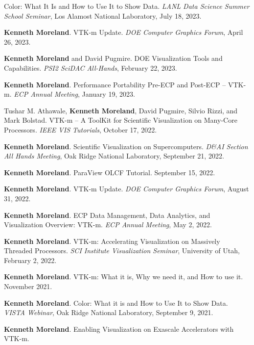\begin{enumerate}[label={[\arabic*]}, left=0pt]
  Color: What It Is and How to Use It to Show Data.
  \emph{LANL Data Science Summer School Seminar}, Los Alamost National Laboratory, July 18, 2023.
\item  %
  \textbf{Kenneth Moreland}.
  VTK-m Update.
  \emph{DOE Computer Graphics Forum}, April 26, 2023.
\item  %
  \textbf{Kenneth Moreland} and David Pugmire.
  DOE Visualization Tools and Capabilities.
  \emph{PSI2 SciDAC All-Hands}, February 22, 2023.
\item  %
  \textbf{Kenneth Moreland}.
  Performance Portability Pre-ECP and Post-ECP -- VTK-m.
  \emph{ECP Annual Meeting}, January 19, 2023.
\item  %
  Tushar M. Athawale, \textbf{Kenneth Moreland}, David Pugmire, Silvio Rizzi, and Mark Bolstad.
  VTK-m -- A ToolKit for Scientific Visualization on Many-Core Processors.
  \emph{IEEE VIS Tutorials}, October 17, 2022.
\item  %
  \textbf{Kenneth Moreland}.
  Scientific Visualization on Supercomputers.
  \emph{D\&AI Section All Hands Meeting}, Oak Ridge National Laboratory, September 21, 2022.
\item  %
  \textbf{Kenneth Moreland}.
  ParaView OLCF Tutorial.
September 15, 2022.
\item  %
  \textbf{Kenneth Moreland}.
  VTK-m Update.
  \emph{DOE Computer Graphics Forum}, August 31, 2022.
\item  %
  \textbf{Kenneth Moreland}.
  ECP Data Management, Data Analytics, and Visualization Overview: VTK-m.
  \emph{ECP Annual Meeting}, May 2, 2022.
\item  %
  \textbf{Kenneth Moreland}.
  VTK-m: Accelerating Visualization on Massively Threaded Processors.
  \emph{SCI Institute Visualization Seminar}, University of Utah, February 2, 2022.
\item  %
  \textbf{Kenneth Moreland}.
  VTK-m: What it is, Why we need it, and How to use it.
November 2021.
\item  %
  \textbf{Kenneth Moreland}.
  Color: What it is and How to Use It to Show Data.
  \emph{VISTA Webinar}, Oak Ridge National Laboratory, September 9, 2021.
\item  %
  \textbf{Kenneth Moreland}.
  Enabling Visualization on Exascale Accelerators with VTK-m.

\end{enumerate}
